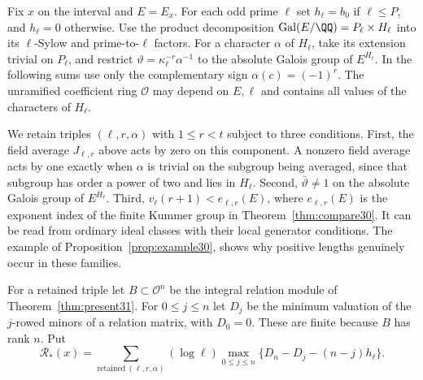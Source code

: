 \documentclass[a4paper,11pt]{article}
\theoremstyle{definition}
\theoremstyle{remark}
\newcommand{\lead}[1]{\par\smallskip\noindent{\bfseries\color{ink}#1.}\enspace}
\numberwithin{equation}{section}
\begin{document}
\lead{Which global lengths remain}Fix \(x\) on the interval and \(E=E_x\). For each odd prime \(\ell\) set \(h_\ell=b_0\) if \(\ell\le P\), and \(h_\ell=0\) otherwise. Use the product decomposition \(\operatorname{Gal}(E/\QQ)=P_\ell\times H_\ell\) into its \(\ell\)-Sylow and prime-to-\(\ell\) factors. For a character \(\alpha\) of \(H_\ell\), take its extension trivial on \(P_\ell\), and restrict \(\vartheta=\kappa_\ell^{-r}\alpha^{-1}\) to the absolute Galois group of \(E^{H_\ell}\). In the following sums use only the complementary sign \(\alpha(c)=(-1)^r\). The unramified coefficient ring \(\mathcal O\) may depend on \(E,\ell\) and contains all values of the characters of \(H_\ell\).

We retain triples \((\ell,r,\alpha)\) with \(1\le r<t\) subject to three conditions. First, the field average \(J_{\ell,r}\) above acts by zero on this component. A nonzero field average acts by one exactly when \(\alpha\) is trivial on the subgroup being averaged, since that subgroup has order a power of two and lies in \(H_\ell\). Second, \(\bar\vartheta\ne1\) on the absolute Galois group of \(E^{H_\ell}\). Third, \(v_\ell(r+1)<e_{\ell,r}(E)\), where \(e_{\ell,r}(E)\) is the exponent index of the finite Kummer group in Theorem~\ref{thm:compare30}. It can be read from ordinary ideal classes with their local generator conditions. The example of Proposition~\ref{prop:example30}, shows why positive lengths genuinely occur in these families.

For a retained triple let \(B\subset\mathcal O^n\) be the integral relation module of Theorem~\ref{thm:present31}. For \(0\le j\le n\) let \(D_j\) be the minimum valuation of the \(j\)-rowed minors of a relation matrix, with \(D_0=0\). These are finite because \(B\) has rank \(n\). Put
\begin{equation}
 \mathcal R_*(x)=\sum_{\mathrm{retained}\ (\ell,r,\alpha)}(\log\ell)
       \max_{0\le j\le n}\{D_n-D_j-(n-j)h_\ell\}.              \label{eq:minors33}
\end{equation}
\end{document}
